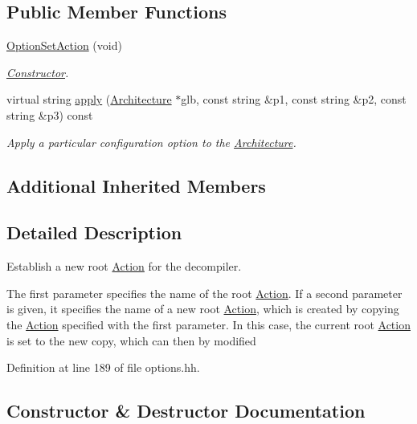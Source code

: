 \subsection*{Public Member Functions}
\begin{DoxyCompactItemize}
\item 
\mbox{\hyperlink{class_option_set_action_a9e4e32c3df742604a422976940c60e33}{Option\+Set\+Action}} (void)
\begin{DoxyCompactList}\small\item\em \mbox{\hyperlink{class_constructor}{Constructor}}. \end{DoxyCompactList}\item 
virtual string \mbox{\hyperlink{class_option_set_action_ab24a366561133f89e6584157d53f7b81}{apply}} (\mbox{\hyperlink{class_architecture}{Architecture}} $\ast$glb, const string \&p1, const string \&p2, const string \&p3) const
\begin{DoxyCompactList}\small\item\em Apply a particular configuration option to the \mbox{\hyperlink{class_architecture}{Architecture}}. \end{DoxyCompactList}\end{DoxyCompactItemize}
\subsection*{Additional Inherited Members}


\subsection{Detailed Description}
Establish a new root \mbox{\hyperlink{class_action}{Action}} for the decompiler. 

The first parameter specifies the name of the root \mbox{\hyperlink{class_action}{Action}}. If a second parameter is given, it specifies the name of a new root \mbox{\hyperlink{class_action}{Action}}, which is created by copying the \mbox{\hyperlink{class_action}{Action}} specified with the first parameter. In this case, the current root \mbox{\hyperlink{class_action}{Action}} is set to the new copy, which can then by modified 

Definition at line 189 of file options.\+hh.



\subsection{Constructor \& Destructor Documentation}
\mbox{\label{class_option_set_action_a9e4e32c3df742604a422976940c60e33}} 
